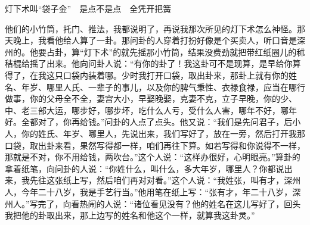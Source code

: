 \documentclass[12pt,UTF8]{ctexbook}
\begin{document}
灯下术叫“袋子金”　是点不是点　全凭开把簧


他们的小竹筒，托门、推法，我都说明了，再说我那次所见的灯下术怎么神怪。那天晚上，我看他给人算了一卦。那问卦的人穿着打扮好像是个买卖人，听口音是深州的。他要占卦，算“灯下术”的就先摇那小竹筒，结果没费劲就把带红纸圈儿的秫秸棍给摇了出来。他向问卦人说：“有你的卦了！我这卦可不是现算，是早给你算得了，在我这只口袋内装着哪。少时我打开口袋，取出卦来，那卦上就有你的姓名、年岁、哪里人氏、一辈子的事儿，以及你的脾气秉性、衣禄食禄，应当在哪行做事，你的父母全不全，妻宫大小，早娶晚娶，克妻不克，立子早晚，你的少、中、老三部大运，哪步好，哪步坏，吃什么人亏，受什么人害，哪年不好，哪年好。全都对了，你再给钱。”问卦的人点了点头。他又说：“我们是先问君子，后小人，你的姓氏、年岁、哪里人，先说出来，我们写好了，放在一旁，然后打开我那口袋，取出卦来看，果然写得都一样，咱们再往下算。如若写得和你说得不一样，那就是不对，你不用给钱，两吹台。”这个人说：“这样办很好，心明眼亮。”算卦的拿着纸笔，向问卦的人说：“你姓什么，叫什么，多大年岁，哪里人？你都说出来，我先往这张纸上写，然后咱们再对对看。”这个人说：“我姓张，叫有才，深州人，今年二十八岁，我是手艺行当。”他用笔在纸上写：“张有才，年二十八岁，深州人。”写完了，向看热闹的人说：“诸位看见没有？他的姓名在这儿写好了，回头我把他的卦取出来，那上边写的姓名和他这个一样，就算我这卦灵。”
\end{document}
